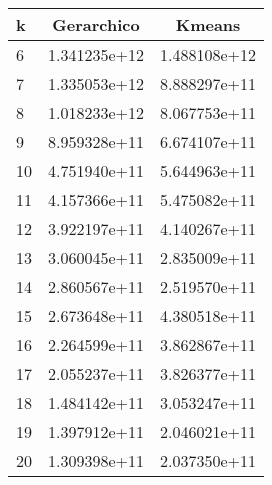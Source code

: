 \begin{tabular}{lcc}
	\toprule
	k  & Gerarchico   & Kmeans       \\
	\midrule
	6  & 1.341235e+12 & 1.488108e+12 \\
	7  & 1.335053e+12 & 8.888297e+11 \\
	8  & 1.018233e+12 & 8.067753e+11 \\
	9  & 8.959328e+11 & 6.674107e+11 \\
	10 & 4.751940e+11 & 5.644963e+11 \\
	11 & 4.157366e+11 & 5.475082e+11 \\
	12 & 3.922197e+11 & 4.140267e+11 \\
	13 & 3.060045e+11 & 2.835009e+11 \\
	14 & 2.860567e+11 & 2.519570e+11 \\
	15 & 2.673648e+11 & 4.380518e+11 \\
	16 & 2.264599e+11 & 3.862867e+11 \\
	17 & 2.055237e+11 & 3.826377e+11 \\
	18 & 1.484142e+11 & 3.053247e+11 \\
	19 & 1.397912e+11 & 2.046021e+11 \\
	20 & 1.309398e+11 & 2.037350e+11 \\
	\bottomrule
\end{tabular}
